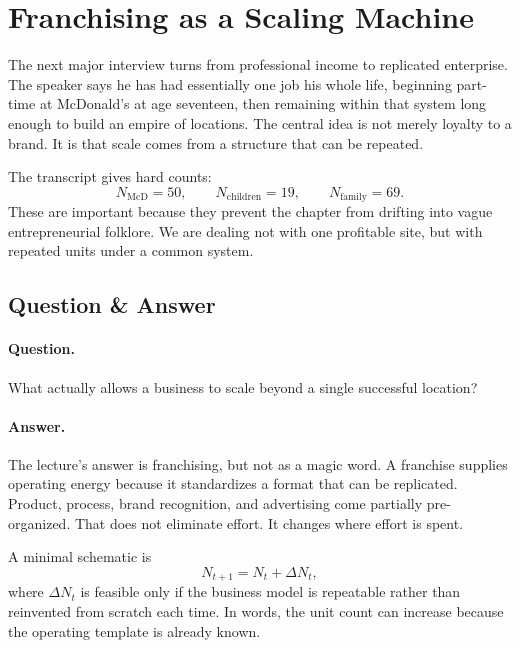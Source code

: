 \section{Franchising as a Scaling Machine}

The next major interview turns from professional income to replicated enterprise. The speaker says he has had essentially one job his whole life, beginning part-time at McDonald's at age seventeen, then remaining within that system long enough to build an empire of locations. The central idea is not merely loyalty to a brand. It is that scale comes from a structure that can be repeated.

The transcript gives hard counts:
\begin{equation}
N_{\mathrm{McD}} = 50, \qquad N_{\mathrm{children}} = 19, \qquad N_{\mathrm{family}} = 69.
\end{equation}
These are important because they prevent the chapter from drifting into vague entrepreneurial folklore. We are dealing not with one profitable site, but with repeated units under a common system.

\subsection{Question \& Answer}

\paragraph{Question.} What actually allows a business to scale beyond a single successful location?

\paragraph{Answer.} The lecture's answer is franchising, but not as a magic word. A franchise supplies operating energy because it standardizes a format that can be replicated. Product, process, brand recognition, and advertising come partially pre-organized. That does not eliminate effort. It changes where effort is spent.

A minimal schematic is
\begin{equation}
N_{t+1} = N_t + \Delta N_t,
\end{equation}
where \(\Delta N_t\) is feasible only if the business model is repeatable rather than reinvented from scratch each time. In words, the unit count can increase because the operating template is already known.


